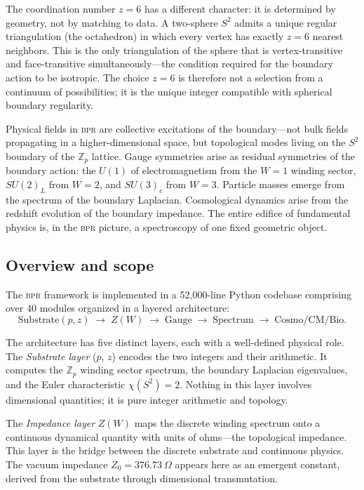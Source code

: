 \documentclass[aps,prd,twocolumn,superscriptaddress,longbibliography,nofootinbib]{revtex4-2}
\newcommand{\Zp}{\mathbb{Z}_p}
\newcommand{\Stwo}{S^2}
\newcommand{\Zimp}{Z}
\newcommand{\Zvac}{Z_0}
\newcommand{\bpr}{\textsc{bpr}}
\begin{document}
The coordination number $z = 6$ has a different character: it is
determined by geometry, not by matching to data.  A two-sphere
$\Stwo$ admits a unique regular triangulation (the octahedron) in
which every vertex has exactly $z = 6$ nearest neighbors.  This is
the only triangulation of the sphere that is vertex-transitive and
face-transitive simultaneously---the condition required for the
boundary action to be isotropic.  The choice $z = 6$ is therefore not
a selection from a continuum of possibilities; it is the unique
integer compatible with spherical boundary regularity.

Physical fields in \bpr{} are collective excitations of the
boundary---not bulk fields propagating in a higher-dimensional space,
but topological modes living on the $\Stwo$ boundary of the
$\Zp$ lattice.  Gauge symmetries arise as residual symmetries of the
boundary action: the $U(1)$ of electromagnetism from the $W = 1$
winding sector, $SU(2)_L$ from $W = 2$, and $SU(3)_c$ from $W = 3$.
Particle masses emerge from the spectrum of the boundary Laplacian.
Cosmological dynamics arise from the redshift evolution of the
boundary impedance.  The entire edifice of fundamental physics is, in
the \bpr{} picture, a spectroscopy of one fixed geometric object.

\subsection{Overview and scope}

The \bpr{} framework is implemented in a 52{,}000-line Python
codebase comprising over 40 modules organized in a layered
architecture:
\begin{equation}
\text{Substrate}(p,z) \;\to\; \Zimp(W) \;\to\;
\text{Gauge} \;\to\; \text{Spectrum} \;\to\;
\text{Cosmo/CM/Bio}.
\label{eq:architecture}
\end{equation}

The architecture has five distinct layers, each with a well-defined
physical role.  The \textit{Substrate layer} ($p$, $z$) encodes the
two integers and their arithmetic.  It computes the $\Zp$ winding
sector spectrum, the boundary Laplacian eigenvalues, and the Euler
characteristic $\chi(\Stwo) = 2$.  Nothing in this layer involves
dimensional quantities; it is pure integer arithmetic and topology.

The \textit{Impedance layer} $\Zimp(W)$ maps the discrete winding
spectrum onto a continuous dynamical quantity with units of ohms---the
topological impedance.  This layer is the bridge between the discrete
substrate and continuous physics.  The vacuum impedance
$\Zvac = 376.73~\Omega$ appears here as an emergent constant, derived
from the substrate through dimensional transmutation.
\end{document}
